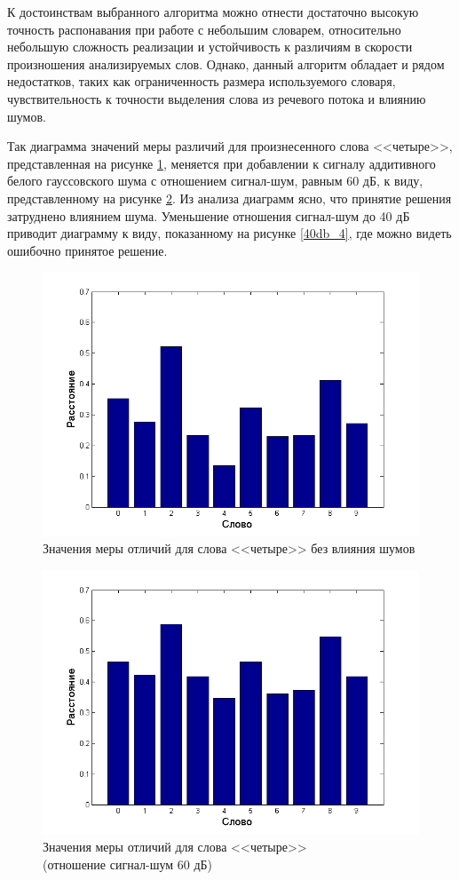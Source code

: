 \documentclass[a4paper,14pt,russian,utf8,nocolumnsxix,nocolumnxxxi,nocolumnxxxii]{eskdtext}
\begin{document}
К достоинствам выбранного алгоритма можно отнести достаточно высокую точность распонавания при работе с небольшим словарем, относительно небольшую сложность реализации и устойчивость к различиям в скорости произношения анализируемых слов. Однако, данный алгоритм обладает и рядом недостатков, таких как ограниченность размера используемого словаря, чувствительность к точности выделения слова из речевого потока и влиянию шумов.


Так диаграмма значений меры различий для произнесенного слова <<четыре>>, представленная на рисунке \ref{clear_4}, меняется при добавлении к сигналу аддитивного белого гауссовского шума с отношением сигнал-шум, равным 60 дБ, к виду, представленному на рисунке \ref{60db_4}. Из анализа диаграмм ясно, что принятие решения затруднено влиянием шума. Уменьшение отношения сигнал-шум до 40 дБ приводит диаграмму к виду, показанному на рисунке \ref{40db_4}, где можно видеть ошибочно принятое решение.

\begin{figure}[H]	
	\centering
	\includegraphics[width=120mm]{clear_4.png}			
	\caption{Значения меры отличий для слова <<четыре>> без влияния шумов}
	\label{clear_4}
\end{figure}

\begin{figure}[H]	
	\centering
	\includegraphics[width=120mm]{60db_4.png}			
	\caption{Значения меры отличий для слова <<четыре>> \\ (отношение сигнал-шум 60 дБ)}
	\label{60db_4}
\end{figure}
\end{document}

